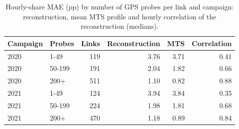 \begin{table}[htbp]\centering
\caption{Hourly-share MAE (pp) by number of GPS probes per link and campaign: reconstruction, mean MTS profile and hourly correlation of the reconstruction (medians).}
\label{tab:probes}
\begin{tabular}{@{}llrrrr@{}}\toprule
Campaign & Probes & Links & Reconstruction & MTS & Correlation \\\midrule
2020 & 1-49 & 119 & 3.76 & 3.71 & 0.41 \\
2020 & 50-199 & 191 & 2.04 & 1.82 & 0.66 \\
2020 & 200+ & 511 & 1.10 & 0.82 & 0.88 \\
2021 & 1-49 & 124 & 3.94 & 3.84 & 0.35 \\
2021 & 50-199 & 224 & 1.98 & 1.81 & 0.68 \\
2021 & 200+ & 470 & 1.18 & 0.89 & 0.84 \\
\bottomrule\end{tabular}\end{table}

